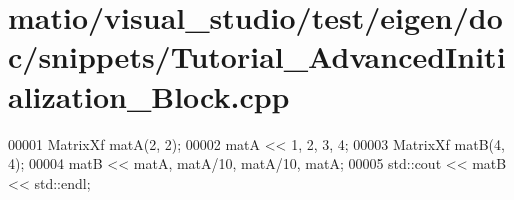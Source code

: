 \hypertarget{matio_2visual__studio_2test_2eigen_2doc_2snippets_2_tutorial___advanced_initialization___block_8cpp_source}{}\section{matio/visual\+\_\+studio/test/eigen/doc/snippets/\+Tutorial\+\_\+\+Advanced\+Initialization\+\_\+\+Block.cpp}
\label{matio_2visual__studio_2test_2eigen_2doc_2snippets_2_tutorial___advanced_initialization___block_8cpp_source}

\begin{DoxyCode}
00001 MatrixXf matA(2, 2);
00002 matA << 1, 2, 3, 4;
00003 MatrixXf matB(4, 4);
00004 matB << matA, matA/10, matA/10, matA;
00005 std::cout << matB << std::endl;
\end{DoxyCode}
